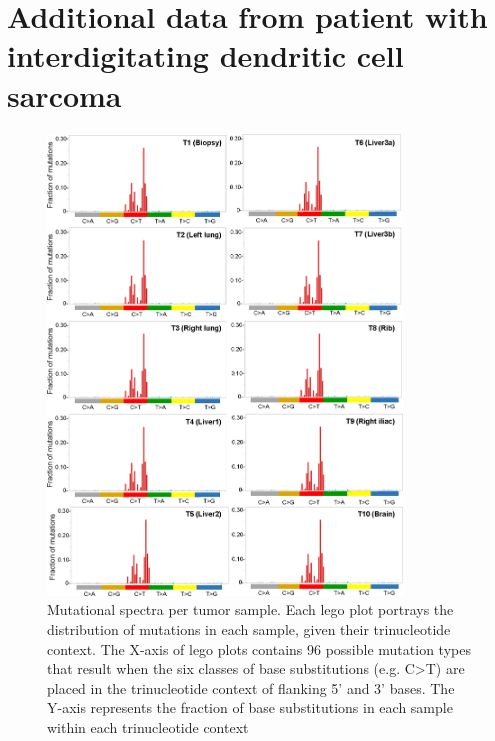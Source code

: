 \chapter{Additional data from patient with interdigitating dendritic cell sarcoma}
\label{app.303}

\begin{figure}[htp]
    \begin{center}
        \includegraphics[width=0.84\textwidth,keepaspectratio]{images/303/mutational_spectra_by_sample}
    \end{center}
    \caption[Mutational spectra per IDCS tumor sample.]{Mutational spectra per tumor sample. Each lego plot portrays the distribution of mutations in each sample, given their trinucleotide context. The X-axis of lego plots contains 96 possible mutation types that result when the six classes of base substitutions (e.g. C\textgreater{}T) are placed in the trinucleotide context of flanking 5' and 3' bases. The Y-axis represents the fraction of base substitutions in each sample within each trinucleotide context}
    \label{fig:303:mutational_spectra_by_sample}
\end{figure}

